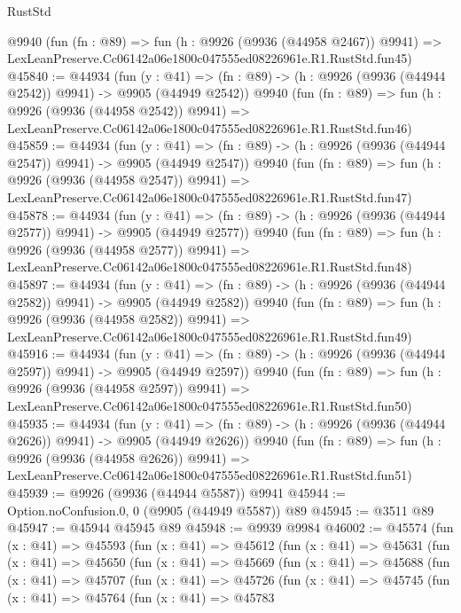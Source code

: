 \begin{lexlean}{RustStd}
\begin{coremodule}
    @9940
    (fun (fn : @89) =>
    fun (h : @9926 (@9936 (@44958 @2467)) @9941) =>
    LexLeanPreserve.Cc06142a06e1800c047555ed08226961e.R1.RustStd.fun45)
@45840 := @44934
    (fun (y : @41) =>
    (fn : @89) -> (h : @9926 (@9936 (@44944 @2542)) @9941) -> @9905 (@44949 @2542))
    @9940
    (fun (fn : @89) =>
    fun (h : @9926 (@9936 (@44958 @2542)) @9941) =>
    LexLeanPreserve.Cc06142a06e1800c047555ed08226961e.R1.RustStd.fun46)
@45859 := @44934
    (fun (y : @41) =>
    (fn : @89) -> (h : @9926 (@9936 (@44944 @2547)) @9941) -> @9905 (@44949 @2547))
    @9940
    (fun (fn : @89) =>
    fun (h : @9926 (@9936 (@44958 @2547)) @9941) =>
    LexLeanPreserve.Cc06142a06e1800c047555ed08226961e.R1.RustStd.fun47)
@45878 := @44934
    (fun (y : @41) =>
    (fn : @89) -> (h : @9926 (@9936 (@44944 @2577)) @9941) -> @9905 (@44949 @2577))
    @9940
    (fun (fn : @89) =>
    fun (h : @9926 (@9936 (@44958 @2577)) @9941) =>
    LexLeanPreserve.Cc06142a06e1800c047555ed08226961e.R1.RustStd.fun48)
@45897 := @44934
    (fun (y : @41) =>
    (fn : @89) -> (h : @9926 (@9936 (@44944 @2582)) @9941) -> @9905 (@44949 @2582))
    @9940
    (fun (fn : @89) =>
    fun (h : @9926 (@9936 (@44958 @2582)) @9941) =>
    LexLeanPreserve.Cc06142a06e1800c047555ed08226961e.R1.RustStd.fun49)
@45916 := @44934
    (fun (y : @41) =>
    (fn : @89) -> (h : @9926 (@9936 (@44944 @2597)) @9941) -> @9905 (@44949 @2597))
    @9940
    (fun (fn : @89) =>
    fun (h : @9926 (@9936 (@44958 @2597)) @9941) =>
    LexLeanPreserve.Cc06142a06e1800c047555ed08226961e.R1.RustStd.fun50)
@45935 := @44934
    (fun (y : @41) =>
    (fn : @89) -> (h : @9926 (@9936 (@44944 @2626)) @9941) -> @9905 (@44949 @2626))
    @9940
    (fun (fn : @89) =>
    fun (h : @9926 (@9936 (@44958 @2626)) @9941) =>
    LexLeanPreserve.Cc06142a06e1800c047555ed08226961e.R1.RustStd.fun51)
@45939 := @9926 (@9936 (@44944 @5587)) @9941
@45944 := Option.noConfusion.{0, 0} (@9905 (@44949 @5587)) @89
@45945 := @3511 @89
@45947 := @45944 @45945 @89
@45948 := @9939 @9984
@46002 := @45574
    (fun (x : @41) =>
    @45593
      (fun (x : @41) =>
      @45612
        (fun (x : @41) =>
        @45631
          (fun (x : @41) =>
          @45650
            (fun (x : @41) =>
            @45669
              (fun (x : @41) =>
              @45688
                (fun (x : @41) =>
                @45707
                  (fun (x : @41) =>
                  @45726
                    (fun (x : @41) =>
                    @45745
                      (fun (x : @41) =>
                      @45764
                        (fun (x : @41) =>
                        @45783

\end{coremodule}
\end{lexlean}
